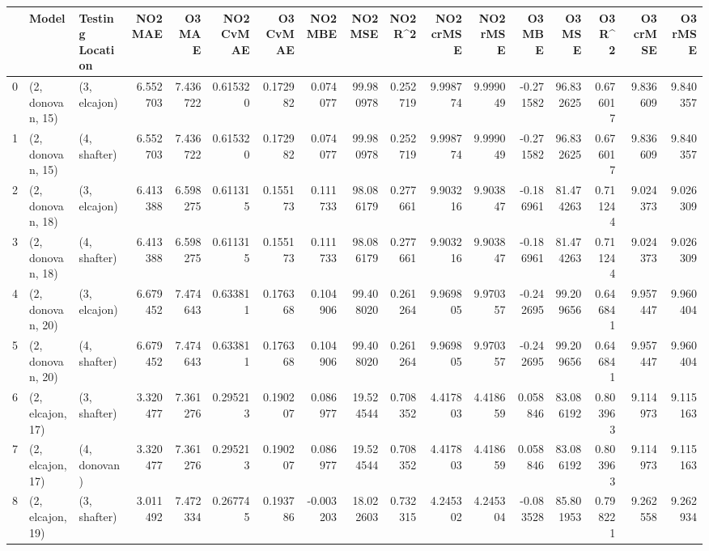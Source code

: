 \begin{tabular}{lllrrrrrrrrrrrrrr}
\toprule
{} &             Model & Testing Location &   NO2 MAE &    O3 MAE &  NO2 CvMAE &  O3 CvMAE &   NO2 MBE &     NO2 MSE &   NO2 R\textasciicircum2 &  NO2 crMSE &   NO2 rMSE &    O3 MBE &      O3 MSE &    O3 R\textasciicircum2 &   O3 crMSE &    O3 rMSE \\
\midrule
0  &  (2, donovan, 15) &     (3, elcajon) &  6.552703 &  7.436722 &   0.615320 &  0.172982 &  0.074077 &   99.980978 &  0.252719 &   9.998774 &   9.999049 & -0.271582 &   96.832625 &  0.676017 &   9.836609 &   9.840357 \\
1  &  (2, donovan, 15) &     (4, shafter) &  6.552703 &  7.436722 &   0.615320 &  0.172982 &  0.074077 &   99.980978 &  0.252719 &   9.998774 &   9.999049 & -0.271582 &   96.832625 &  0.676017 &   9.836609 &   9.840357 \\
2  &  (2, donovan, 18) &     (3, elcajon) &  6.413388 &  6.598275 &   0.611315 &  0.155173 &  0.111733 &   98.086179 &  0.277661 &   9.903216 &   9.903847 & -0.186961 &   81.474263 &  0.711244 &   9.024373 &   9.026309 \\
3  &  (2, donovan, 18) &     (4, shafter) &  6.413388 &  6.598275 &   0.611315 &  0.155173 &  0.111733 &   98.086179 &  0.277661 &   9.903216 &   9.903847 & -0.186961 &   81.474263 &  0.711244 &   9.024373 &   9.026309 \\
4  &  (2, donovan, 20) &     (3, elcajon) &  6.679452 &  7.474643 &   0.633811 &  0.176368 &  0.104906 &   99.408020 &  0.261264 &   9.969805 &   9.970357 & -0.242695 &   99.209656 &  0.646841 &   9.957447 &   9.960404 \\
5  &  (2, donovan, 20) &     (4, shafter) &  6.679452 &  7.474643 &   0.633811 &  0.176368 &  0.104906 &   99.408020 &  0.261264 &   9.969805 &   9.970357 & -0.242695 &   99.209656 &  0.646841 &   9.957447 &   9.960404 \\
6  &  (2, elcajon, 17) &     (3, shafter) &  3.320477 &  7.361276 &   0.295213 &  0.190207 &  0.086977 &   19.524544 &  0.708352 &   4.417803 &   4.418659 &  0.058846 &   83.086192 &  0.803963 &   9.114973 &   9.115163 \\
7  &  (2, elcajon, 17) &     (4, donovan) &  3.320477 &  7.361276 &   0.295213 &  0.190207 &  0.086977 &   19.524544 &  0.708352 &   4.417803 &   4.418659 &  0.058846 &   83.086192 &  0.803963 &   9.114973 &   9.115163 \\
8  &  (2, elcajon, 19) &     (3, shafter) &  3.011492 &  7.472334 &   0.267745 &  0.193786 & -0.003203 &   18.022603 &  0.732315 &   4.245302 &   4.245304 & -0.083528 &   85.801953 &  0.798221 &   9.262558 &   9.262934 \\

\end{tabular}
